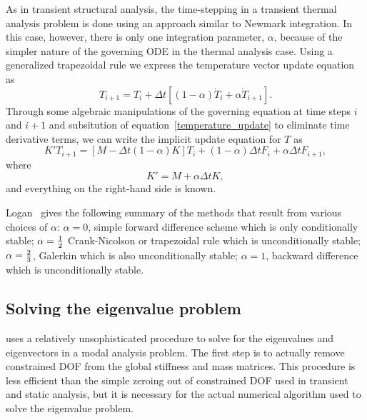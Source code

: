 As in transient structural analysis, the time-stepping in a transient
thermal analysis problem is done using an approach similar to Newmark integration.
In this case, however, there is only one integration parameter, $\alpha$,
because of the simpler nature of the governing ODE in the thermal
analysis case.  Using a generalized trapezoidal rule we express the 
temperature vector update equation as
\begin{equation}
{T_{i+1}} = {T_{i} + \Delta t \left[{\left(1 - \alpha \right) {\dot T}_{i} + \alpha {\dot T}_{i+1}}\right]}.
\label{temperature_update}
\end{equation}
Through some algebraic manipulations of the governing equation at time
steps $i$ and $i+1$ and subsitution of equation~\ref{temperature_update}
to eliminate time derivative terms, we can write the implicit update 
equation for $T$ as
\begin{equation}
{K' T_{i+1}} = {\left[M - \Delta t \left(1 - \alpha \right) K \right] T_{i} + 
               \left(1 - \alpha \right) \Delta t F_{i} + 
               \alpha \Delta t F_{i+1}},
\end{equation}
where 
\begin{equation}
{K'} = {M + \alpha \Delta t K},
\end{equation}
and everything on the right-hand side is known.

Logan~\cite{logan:fem} gives the following summary of the methods that
result from various choices of $\alpha$:
$\alpha = 0$, simple forward difference scheme which is only conditionally 
stable;  $\alpha = {1 \over 2}$ Crank-Nicolson or trapezoidal rule which is 
unconditionally stable; $\alpha = {2 \over 3}$, Galerkin which is also 
unconditionally stable; $\alpha = 1$, backward difference which is 
unconditionally stable.

\subsection{Solving the eigenvalue problem}

\felt{} uses a relatively unsophisticated procedure to solve for the 
eigenvalues and eigenvectors in a modal analysis problem.  The first step is
to actually remove constrained DOF from the global stiffness and mass
matrices.  This procedure is less efficient than the simple zeroing out of
constrained DOF used in transient and static analysis, but it is necessary
for the actual numerical algorithm used to solve the eigenvalue problem.

